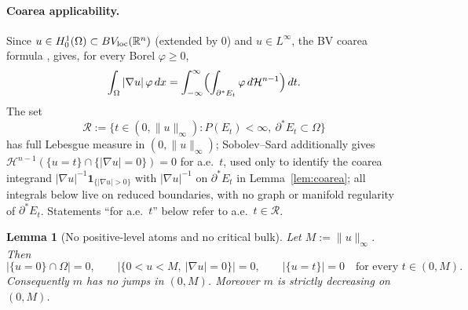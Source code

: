 \documentclass[11pt]{article}
\newtheorem{lemma}[theorem]{Lemma}
\theoremstyle{definition}
\newcommand{\R}{\mathbb{R}}
\newcommand{\Om}{\Omega}
\begin{document}
\paragraph{Coarea applicability.} Since $u\in H^{1}_{0}(\Om)\subset
BV_{\rm loc}(\R^{n})$ (extended by $0$) and $u\in L^{\infty}$, the BV
coarea formula \cite[Thm.~13.1]{Maggi2012}, \cite[Thm.~3.40]{AFP2000}
gives, for every Borel $\varphi\ge 0$,
\begin{equation}\label{eq:coarea}
   \int_{\Om}|\nabla u|\,\varphi\,dx
   =\int_{-\infty}^{\infty}\Bigl(\int_{\partial^{*}E_{t}}\varphi\,d\mathcal
   H^{n-1}\Bigr)\,dt.
\end{equation}
The set
\[
   \mathcal R:=\bigl\{t\in(0,\|u\|_{\infty}):
   P(E_{t})<\infty,\ \partial^{*}E_{t}\subset\Om\bigr\}
\]
has full Lebesgue measure in $(0,\|u\|_{\infty})$; Sobolev--Sard
\cite[App.~A, Thm.~A.1]{FigalliMaggi2011} additionally gives
$\mathcal H^{n-1}(\{u=t\}\cap\{|\nabla u|=0\})=0$ for a.e.\ $t$, used
only to identify the coarea integrand
$|\nabla u|^{-1}\mathbf 1_{\{|\nabla u|>0\}}$ with $|\nabla u|^{-1}$ on
$\partial^{*}E_{t}$ in Lemma~\ref{lem:coarea}; all integrals below live
on reduced boundaries, with no graph or manifold regularity of
$\partial^{*}E_{t}$.
Statements ``for a.e.\ $t$'' below refer to a.e.\ $t\in\mathcal R$.

\begin{lemma}[No positive-level atoms and no critical bulk]\label{lem:noatoms}
Let $M:=\|u\|_{\infty}$. Then
\[
   |\{u=0\}\cap\Om|=0,\qquad
   |\{0<u<M,\ |\nabla u|=0\}|=0,
   \qquad
   |\{u=t\}|=0\quad\text{for every }t\in(0,M).
\]
Consequently $m$ has no jumps in $(0,M)$.
Moreover $m$ is strictly decreasing on $(0,M)$.
\end{lemma}
\end{document}
